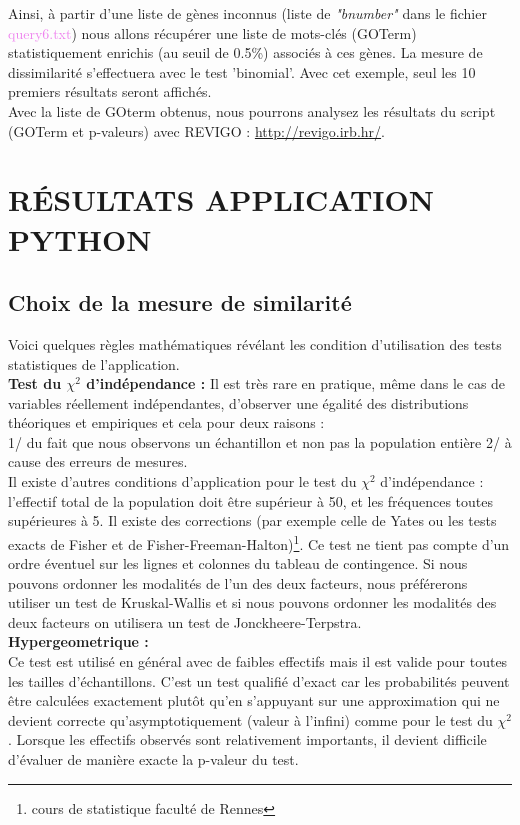 \documentclass[a4paper,11pt,openright]{report}
\begin{document}
Ainsi, à  partir d'une liste de gènes inconnus (liste de \textit{"bnumber"} dans le fichier \textcolor{violet}{query6.txt}) nous allons récupérer une liste de mots-clés (GOTerm) statistiquement enrichis (au seuil de 0.5\%) associés à ces gènes. La mesure de dissimilarité s'effectuera avec le test 'binomial'. Avec cet exemple, seul les 10 premiers résultats seront affichés. \\ 
Avec la liste de GOterm obtenus, nous pourrons analysez les résultats du script (GOTerm et p-valeurs) avec REVIGO : \url{http://revigo.irb.hr/}.

    \section{RÉSULTATS APPLICATION PYTHON}
    	\subsection{Choix de la mesure de similarité}
Voici quelques règles mathématiques révélant les condition d'utilisation des tests statistiques de l'application. \\

\textbf{Test du $\chi^2$ d'indépendance : }
Il est très rare en pratique, même dans le cas de variables réellement indépendantes, d’observer une égalité des distributions théoriques et empiriques et cela pour deux raisons : \\
1/ du fait que nous observons un échantillon et non pas la population entière
2/ à cause des erreurs de mesures. \\ 
Il existe d'autres conditions d'application pour le test du  $\chi^2$ d'indépendance : l'effectif total de la population doit être supérieur à 50, et les fréquences toutes supérieures à 5. Il existe des corrections (par exemple celle de Yates ou les tests exacts de Fisher et de Fisher-Freeman-Halton)\footnote{cours de statistique faculté de Rennes}.
Ce test ne tient pas compte d'un ordre éventuel sur les lignes et colonnes du tableau de contingence. Si nous pouvons ordonner les modalités de l’un des deux facteurs, nous préférerons utiliser un test de Kruskal-Wallis et si nous pouvons ordonner les modalités des deux facteurs on utilisera un test de Jonckheere-Terpstra. \\

\textbf{Hypergeometrique : } \\
Ce test est utilisé en général avec de faibles effectifs mais il est valide pour toutes les tailles d'échantillons. C'est un test qualifié d'exact car les probabilités peuvent être calculées exactement plutôt qu'en s'appuyant sur une approximation qui ne devient correcte qu'asymptotiquement (valeur à l'infini) comme pour le test du $\chi^2$. Lorsque les effectifs observés sont relativement importants, il devient difficile d’évaluer de manière exacte la p-valeur du test. \\
\end{document}

